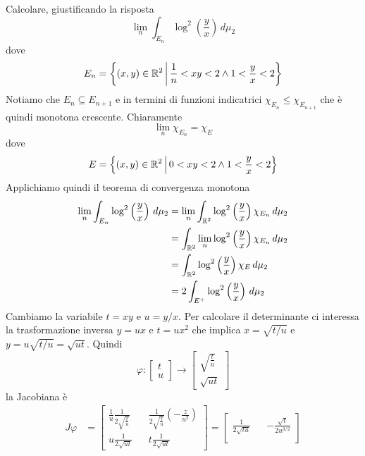 \documentclass[a4paper]{article}
\begin{document}
\pagebreak

\begin{snippetexercise}{}
    Calcolare, giustificando la risposta
    \[
        \lim_{n} \int_{E_n} \log^2 \left(\frac{y}{x}\right)\,d\mu_2
    \]
    dove
    \[
        E_n = \left\{(x,y) \in \mathbb{R}^2 \,\middle|\, \frac{1}{n} < xy < 2 \land 1 < \frac{y}{x} < 2\right\}
    \]
    Notiamo che \(E_n \subseteq E_{n+1}\) e in termini di funzioni indicatrici \(\chi_{E_n} \leq \chi_{E_{n + 1}}\)
    che è quindi monotona crescente. Chiaramente
    \[
        \lim_n \chi_{E_n} = \chi_E
    \]
    dove
    \[
        E = \left\{(x,y) \in \mathbb{R}^2 \,\middle|\, 0 < xy < 2 \land 1 < \frac{y}{x} < 2\right\}
    \]
    Applichiamo quindi il teorema di convergenza monotona
    \begin{align*}
        \lim_{n} \int_{E_n} \log^2 \left(\frac{y}{x}\right)\,d\mu_2
        &= \lim_n \int_{\mathbb{R}^2}  \log^2 \left(\frac{y}{x}\right) \chi_{E_n} \,d\mu_2 \\
        &= \int_{\mathbb{R}^2} \lim_n \log^2 \left(\frac{y}{x}\right) \chi_{E_n} \,d\mu_2 \\
        &= \int_{\mathbb{R}^2} \log^2 \left(\frac{y}{x}\right) \chi_{E} \,d\mu_2 \\
        &= 2 \int_{E^+} \log^2 \left(\frac{y}{x}\right) \,d\mu_2 \\
    \end{align*}
    Cambiamo la variabile \(t = xy\) e \(u = y/x\). Per calcolare il determinante ci interessa la trasformazione inversa
    \(y = ux\) e \(t = u x^2\) che implica \(x = \sqrt{t/u}\) e \(y = u\sqrt{t/u} = \sqrt{ut}\).
    Quindi
    \[
        \varphi \colon \begin{bmatrix} t \\ u \end{bmatrix} \to
        \begin{bmatrix} \sqrt{\frac{t}{u}} \\ \sqrt{ut} \end{bmatrix}
    \]
    la Jacobiana è
    \begin{align*}
        J\varphi &= \begin{bmatrix}
            \frac{1}{u}\frac{1}{2\sqrt{\frac{t}{u}}} && \frac{1}{2\sqrt{\frac{t}{u}}}\left(- \frac{z}{u^2}\right) \\
            u\frac{1}{2\sqrt{ut}} && t\frac{1}{2\sqrt{ut}}
        \end{bmatrix}
        = \begin{bmatrix}
            \frac{1}{2\sqrt{tu}} && - \frac{\sqrt{t}}{2u^{3/2}} \\

\end{bmatrix}
\end{align*}
\end{snippetexercise}
\end{document}
